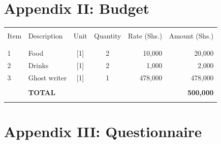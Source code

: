 \clearpage  %
\section*{Appendix II: Budget}
%

\begin{center}%
\begin{minipage}{\columnwidth}%
	\centering%
	\label{tbl:Budget}
	\begin{tabular}{llccrr}
		\hline \\
			Item & Description    & Unit      & Quantity  & Rate (Shs.) & Amount (Shs.)    \\
		\\
		\hline \\				
			1    & Food           & [1]       & 2         & 10,000      & 20,000           \\
			2    & Drinks         & [1]       & 2         & 1,000       & 2,000            \\
			3    & Ghost writer   & [1]       & 1         & 478,000     & 478,000          \\
		\\
			 & \textbf{TOTAL} &           &           &             & \textbf{500,000}\\
		\hline \\ 
	\end{tabular}
\end{minipage}
\end{center}

\clearpage  %
\section*{Appendix III: Questionnaire}
%

